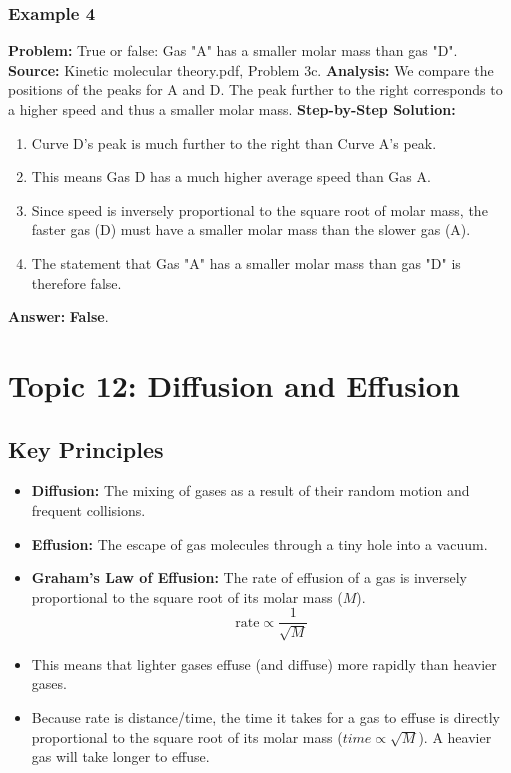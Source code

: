 \documentclass{article}
\begin{document}
\subsubsection{Example 4}
\textbf{Problem:} True or false: Gas "A" has a smaller molar mass than gas "D".
\textbf{Source:} Kinetic molecular theory.pdf, Problem 3c.
\textbf{Analysis:} We compare the positions of the peaks for A and D. The peak further to the right corresponds to a higher speed and thus a smaller molar mass.
\textbf{Step-by-Step Solution:}
\begin{enumerate}
    \item Curve D's peak is much further to the right than Curve A's peak.
    \item This means Gas D has a much higher average speed than Gas A.
    \item Since speed is inversely proportional to the square root of molar mass, the faster gas (D) must have a smaller molar mass than the slower gas (A).
    \item The statement that Gas "A" has a smaller molar mass than gas "D" is therefore false.
\end{enumerate}
\textbf{Answer:} \textbf{False}.

\section{Topic 12: Diffusion and Effusion}
\subsection{Key Principles}
\begin{itemize}
    \item \textbf{Diffusion:} The mixing of gases as a result of their random motion and frequent collisions.
    \item \textbf{Effusion:} The escape of gas molecules through a tiny hole into a vacuum.
    \item \textbf{Graham's Law of Effusion:} The rate of effusion of a gas is inversely proportional to the square root of its molar mass ($M$).
    \[ \text{rate} \propto \frac{1}{\sqrt{M}} \]
    \item This means that lighter gases effuse (and diffuse) more rapidly than heavier gases.
    \item Because rate is distance/time, the time it takes for a gas to effuse is directly proportional to the square root of its molar mass ($time \propto \sqrt{M}$). A heavier gas will take longer to effuse.
\end{itemize}
\end{document}
